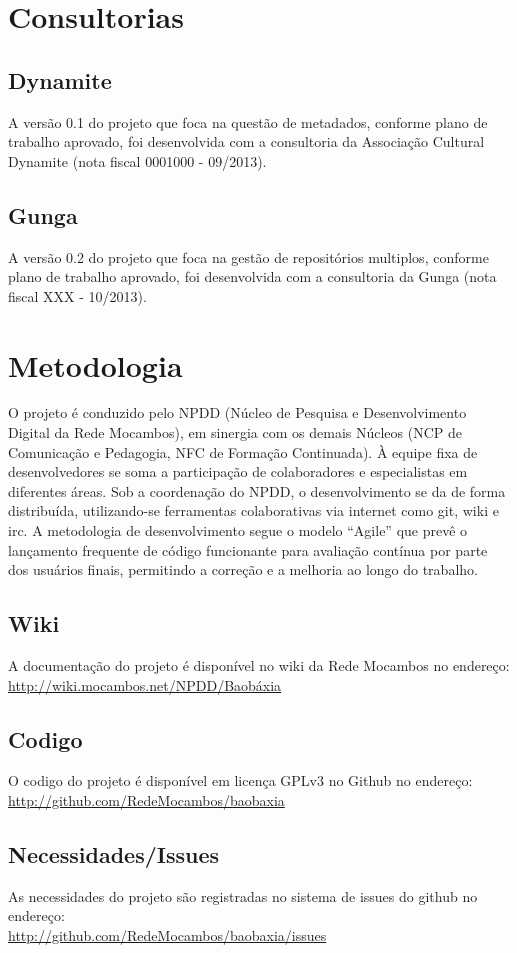 \section{Consultorias}
\subsection{Dynamite}
A versão 0.1 do projeto que foca na questão de metadados, conforme
plano de trabalho aprovado, foi desenvolvida com a consultoria da
Associação Cultural Dynamite (nota fiscal 0001000 - 09/2013).

\subsection{Gunga}
A versão 0.2 do projeto que foca na gestão de repositórios multiplos,
conforme plano de trabalho aprovado, foi desenvolvida com a
consultoria da Gunga (nota fiscal XXX - 10/2013).


\section{Metodologia}
O projeto é conduzido pelo NPDD (Núcleo de Pesquisa e Desenvolvimento
Digital da Rede Mocambos), em sinergia com os demais Núcleos (NCP de
Comunicação e Pedagogia, NFC de Formação Continuada). À equipe fixa de
desenvolvedores se soma a participação de colaboradores e
especialistas em diferentes áreas. Sob a coordenação do NPDD, o
desenvolvimento se da de forma distribuída, utilizando-se ferramentas
colaborativas via internet como git, wiki e irc. A metodologia de
desenvolvimento segue o modelo ``Agile'' que prevê o lançamento
frequente de código funcionante para avaliação contínua por parte dos
usuários finais, permitindo a correção e a melhoria ao longo do
trabalho.

\subsection{Wiki}
A documentação do projeto é disponível no wiki da Rede Mocambos no
endereço: \\ \url{http://wiki.mocambos.net/NPDD/Baobáxia}

\subsection{Codigo}
O codigo do projeto é disponível em licença GPLv3 no Github no
endereço: \\ \url{http://github.com/RedeMocambos/baobaxia}

\subsection{Necessidades/Issues}
As necessidades do projeto são registradas no sistema de issues do
github no endereço:
\\ \url{http://github.com/RedeMocambos/baobaxia/issues}

